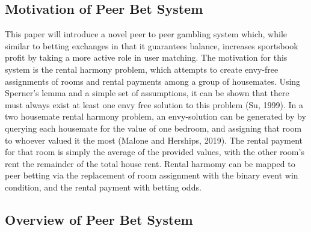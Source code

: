 \documentclass[sn-mathphys-num]{sn-jnl}
\theoremstyle{thmstyleone}%
\theoremstyle{thmstyletwo}%
\theoremstyle{thmstylethree}%
\begin{document}
\subsection{Motivation of Peer Bet System}

This paper will introduce a novel peer to peer gambling system which, while similar to betting exchanges in that it guarantees balance, increases sportsbook profit by taking a more active role in user matching. The motivation for this system is the rental harmony problem, which attempts to create envy-free assignments of rooms and rental payments among a group of housemates. Using Sperner's lemma and a simple set of assumptions, it can be shown that there must always exist at least one envy free solution to this problem (Su, 1999).  In a two housemate rental harmony problem, an envy-solution can be generated by by querying each housemate for the value of one bedroom, and assigning that room to whoever valued it the most  (Malone and Herships, 2019). The rental payment for that room is simply the average of the provided values, with the other room's rent the remainder of the total house rent. Rental harmomy can be mapped to peer betting via the replacement of room assignment with the binary event win condition, and the rental payment with betting odds. 

\subsection{Overview of Peer Bet System}
\end{document}
